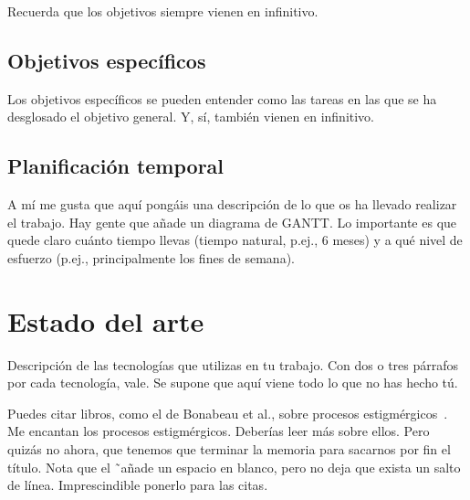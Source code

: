 \documentclass[a4paper, 12pt]{book}
\begin{document}
Recuerda que los objetivos siempre vienen en infinitivo.


\section{Objetivos específicos}
\label{sec:objetivos-especificos}

Los objetivos específicos se pueden entender como las tareas en las que se ha desglosado el objetivo general.
Y, sí, también vienen en infinitivo.


\section{Planificación temporal}
\label{sec:planificacion-temporal}

A mí me gusta que aquí pongáis una descripción de lo que os ha llevado realizar el trabajo.
Hay gente que añade un diagrama de GANTT.
Lo importante es que quede claro cuánto tiempo llevas (tiempo natural, p.ej., 6 meses) y a qué nivel de esfuerzo (p.ej., principalmente los fines de semana).



\cleardoublepage
\chapter{Estado del arte}
\label{chap:estado}

Descripción de las tecnologías que utilizas en tu trabajo. 
Con dos o tres párrafos por cada tecnología, vale. 
Se supone que aquí viene todo lo que no has hecho tú.

Puedes citar libros, como el de Bonabeau et al., sobre procesos estigmérgicos~\cite{bonabeau:_swarm}. 
Me encantan los procesos estigmérgicos.
Deberías leer más sobre ellos.
Pero quizás no ahora, que tenemos que terminar la memoria para sacarnos por fin el título.
Nota que el \~ \ añade un espacio en blanco, pero no deja que exista un salto de línea. 
Imprescindible ponerlo para las citas.
\end{document}
